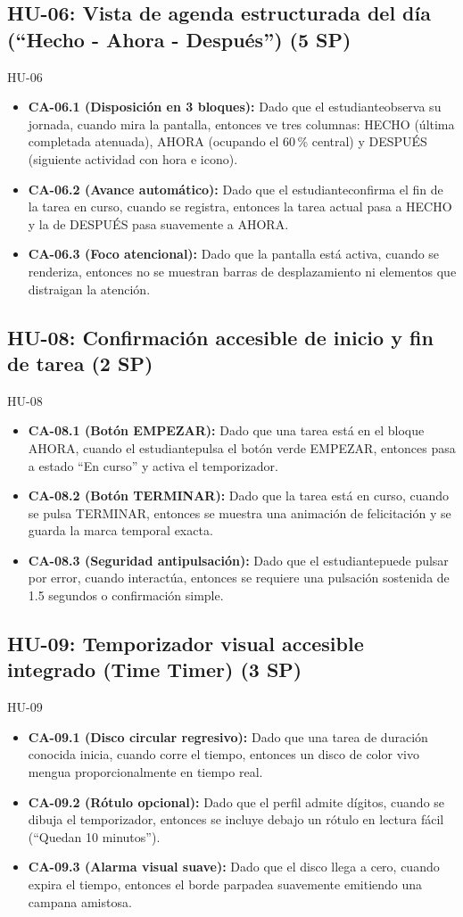 \documentclass[11pt,a4paper]{article}
\newcommand{\ca}[2]{\item \textbf{#1:} #2}
\begin{document}
\subsection{HU-06: Vista de agenda estructurada del día (``Hecho - Ahora - Después'') (5 SP)}
\begin{criterios}{HU-06}
\begin{itemize}
\ca{CA-06.1 (Disposición en 3 bloques)}{Dado que el estudianteobserva su jornada, cuando mira la pantalla, entonces ve tres columnas: HECHO (última completada atenuada), AHORA (ocupando el 60\,\% central) y DESPUÉS (siguiente actividad con hora e icono).}
\ca{CA-06.2 (Avance automático)}{Dado que el estudianteconfirma el fin de la tarea en curso, cuando se registra, entonces la tarea actual pasa a HECHO y la de DESPUÉS pasa suavemente a AHORA.}
\ca{CA-06.3 (Foco atencional)}{Dado que la pantalla está activa, cuando se renderiza, entonces no se muestran barras de desplazamiento ni elementos que distraigan la atención.}
\end{itemize}
\end{criterios}

\subsection{HU-08: Confirmación accesible de inicio y fin de tarea (2 SP)}
\begin{criterios}{HU-08}
\begin{itemize}
\ca{CA-08.1 (Botón EMPEZAR)}{Dado que una tarea está en el bloque AHORA, cuando el estudiantepulsa el botón verde EMPEZAR, entonces pasa a estado ``En curso'' y activa el temporizador.}
\ca{CA-08.2 (Botón TERMINAR)}{Dado que la tarea está en curso, cuando se pulsa TERMINAR, entonces se muestra una animación de felicitación y se guarda la marca temporal exacta.}
\ca{CA-08.3 (Seguridad antipulsación)}{Dado que el estudiantepuede pulsar por error, cuando interactúa, entonces se requiere una pulsación sostenida de 1.5 segundos o confirmación simple.}
\end{itemize}
\end{criterios}

\subsection{HU-09: Temporizador visual accesible integrado (Time Timer) (3 SP)}
\begin{criterios}{HU-09}
\begin{itemize}
\ca{CA-09.1 (Disco circular regresivo)}{Dado que una tarea de duración conocida inicia, cuando corre el tiempo, entonces un disco de color vivo mengua proporcionalmente en tiempo real.}
\ca{CA-09.2 (Rótulo opcional)}{Dado que el perfil admite dígitos, cuando se dibuja el temporizador, entonces se incluye debajo un rótulo en lectura fácil (``Quedan 10 minutos'').}
\ca{CA-09.3 (Alarma visual suave)}{Dado que el disco llega a cero, cuando expira el tiempo, entonces el borde parpadea suavemente emitiendo una campana amistosa.}
\end{itemize}
\end{criterios}
\end{document}
